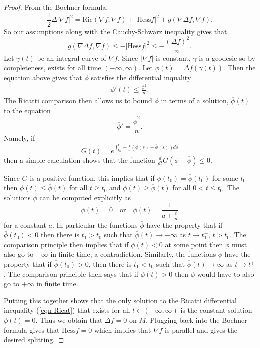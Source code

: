 \documentclass{amsart}
\theoremstyle{plain}
\numberwithin{equation}{section}
\begin{document}
\begin{proof}
    From the Bochner formula, 
    \[ \frac{1}{2} \Delta|\nabla f|^2 = \mathrm{Ric}(\nabla f, \nabla f) + |\mathrm{Hess} f|^2 + g(\nabla \Delta f, \nabla f). \]
    So our assumptions along with the Cauchy-Schwarz inequality gives that 
    \[ g(\nabla \Delta f, \nabla f) \leq -|\mathrm{Hess} f|^2 \leq - \frac{(\Delta f)^2}{n}. \]
    Let $\gamma(t)$ be an integral curve of $\nabla f$. Since $|\nabla f|$ is constant, $\gamma$ is a geodesic so by completeness, exists for all time $(-\infty, \infty)$.  Let $\phi(t) = \Delta f(\gamma(t))$. Then the equation above gives that $\phi$ satisfies the differential inquality 
    \begin{align} \label{eqn-Ricat}
      \phi'(t) \leq \frac{\phi^2}{n}.  
    \end{align} 
    The Ricatti comparison then allows us to bound $\phi$ in terms of a solution,  $\overline{\phi}(t)$ to the equation
    \[ \overline{\phi}' = \frac{\overline{\phi}^2}{n}. \]
     Namely, if 
    \[ G(t) = e^{ \int_{t_0}^{t} -\frac{1}{n}(\phi(s) + \overline{\phi}(s)) ds } \] then a simple calculation shows that the function $\frac{d}{dt} G(\phi-\overline{\phi})\leq 0$.  

    Since $G$ is a positive function, this implies that if $\phi(t_0) = \overline{\phi}(t_0) $ for some $t_0$ then $\phi(t) \leq \overline{\phi}(t)$ for all $t \geq t_0$ and $\phi(t) \geq \overline{\phi}(t)$ for all $0<t \leq t_0$.  The solutions $\overline{\phi}$ can be computed explicitly as 
    \[ \overline{\phi}(t) = 0 \quad \text{or} \quad \overline{\phi}(t)  = \frac{1}{a+ \frac{t}{n}} \]
    for a constant $a$.  In particular the functions $\overline{\phi}$ have the property that if $\overline{\phi}(t_0)<0$ then there is $t_1>t_0$ such that $\overline{\phi}(t) \to -\infty$ as $t\to t_1^-$, $t>t_0$.  The comparison principle then implies that if $\phi(t)<0$ at some point then $\phi$ must also go to $-\infty$ in finite time, a contradiction. Similarly, the functions $\overline{\phi}$ have the property that if $\overline{\phi}(t_0) > 0$, then there is $t_1< t_0$ such that $\overline{\phi}(t) \to \infty$ as $t \to t^+$.  The comparison principle then says that if $\phi(t)>0$ then $\phi$ would have to also go to $+\infty$ in finite time.  

    Putting this together shows that the only solution to the Ricatti differential inequality (\ref{eqn-Ricat}) that exists for all $t \in (-\infty, \infty)$ is the constant solution $\phi(t) = 0$.  Thus we obtain that $\Delta f=0$ on $M$.  Plugging back into the Bochner formula gives that $\mathrm{Hess} f  = 0$ which implies that $\nabla f$ is parallel and gives the desired splitting. 
\end{proof}
\end{document}
